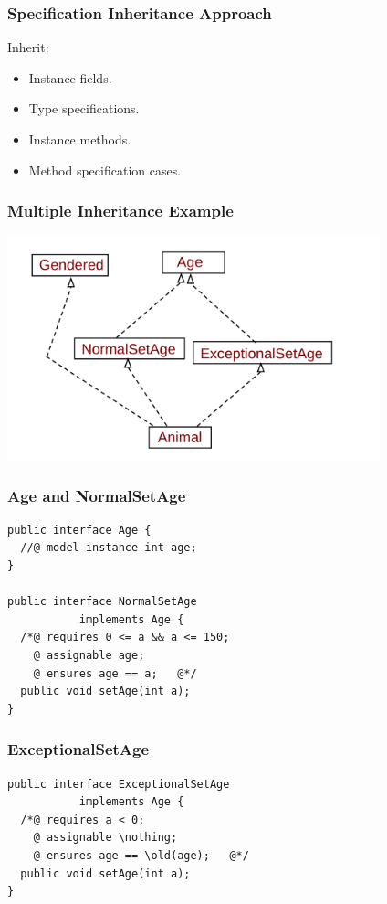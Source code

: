 \begin{frame}
\frametitle{Specification Inheritance Approach}

Inherit:
\begin{itemize}
\item
Instance fields.

\item
Type specifications.

\item
Instance methods.

\item
Method specification cases.
\end{itemize}
\end{frame}

\begin{frame}
\frametitle{Multiple Inheritance Example}
\includegraphics[width=4.25in]{multiple-inh}
\end{frame}

\begin{frame}[fragile]
\frametitle{Age and NormalSetAge}
\begin{lstlisting}
public interface Age {
  //@ model instance int age;
}

public interface NormalSetAge 
           implements Age {
  /*@ requires 0 <= a && a <= 150;
    @ assignable age;
    @ ensures age == a;   @*/
  public void setAge(int a);
}
\end{lstlisting}
\end{frame}

\begin{frame}[fragile]
\frametitle{ExceptionalSetAge}
\begin{lstlisting}
public interface ExceptionalSetAge
           implements Age {
  /*@ requires a < 0;
    @ assignable \nothing;
    @ ensures age == \old(age);   @*/
  public void setAge(int a);
}
\end{lstlisting}
\end{frame}


